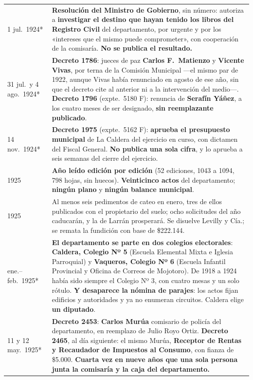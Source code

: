 \begin{longtable}{@{}p{2.7cm}p{10.3cm}@{}}
1 jul.\ 1924* & \textbf{Resolución del Ministro de Gobierno}, sin número: autoriza a \textbf{investigar el destino que hayan tenido los libros del Registro Civil} del departamento, por urgente y por los «intereses que el mismo puede comprometer», con cooperación de la comisaría. \textbf{No se publica el resultado.} \\
31 jul.\ y 4 ago.\ 1924* & \textbf{Decreto 1786}: jueces de paz \textbf{Carlos F.\ Matienzo}\index{Matienzo, Carlos} y \textbf{Vicente Vivas}, por terna de la Comisión Municipal ---el mismo par de 1922, aunque Vivas había renunciado en agosto de ese año, sin que el decreto cite al anterior ni a la intervención del medio---. \textbf{Decreto 1796} (expte.\ 5180 F): renuncia de \textbf{Serafín Yáñez}, a los cuatro meses de ser designado, \textbf{sin reemplazante publicado}. \\
14 nov.\ 1924* & \textbf{Decreto 1975} (expte.\ 5162 F): \textbf{aprueba el presupuesto municipal} de La Caldera del ejercicio en curso, con dictamen del Fiscal General. \textbf{No publica una sola cifra}, y lo aprueba a seis semanas del cierre del ejercicio. \\
1925 & \textbf{Año leído edición por edición} (52 ediciones, 1043 a 1094, 798 hojas, sin huecos). \textbf{Veinticinco actos} del departamento; \textbf{ningún plano} y \textbf{ningún balance municipal}. \\
1925 & Al menos seis pedimentos de cateo en enero, tres de ellos publicados con el propietario del suelo; ocho solicitudes del año caducarán, y la de Larrán prosperará. Se disuelve Levilly y Cía.; se remata la fundición con base de \$222.144. \\
ene.--feb.\ 1925* & \textbf{El departamento se parte en dos colegios electorales}: \textbf{Caldera, Colegio Nº 5} (Escuela Elemental Mixta e Iglesia Parroquial) y \textbf{Vaqueros, Colegio Nº 6} (Escuela Infantil Provincial y Oficina de Correos de Mojotoro). De 1918 a 1924 había sido siempre el Colegio Nº 3, con cuatro mesas y un solo rótulo. \textbf{Y desaparece la nómina de parajes}: los actos fijan edificios y autoridades y ya no enumeran circuitos. Caldera elige \textbf{un diputado}. \\
11 y 12 may.\ 1925* & \textbf{Decreto 2453}: \textbf{Carlos Murúa}\index{Murúa, Carlos} comisario de policía del departamento, en reemplazo de Julio Royo Ortiz. \textbf{Decreto 2465}, al día siguiente: el mismo Murúa, \textbf{Receptor de Rentas y Recaudador de Impuestos al Consumo}, con fianza de \$5.000. \textbf{Cuarta vez en nueve años que una sola persona junta la comisaría y la caja del departamento.} \\

\end{longtable}
